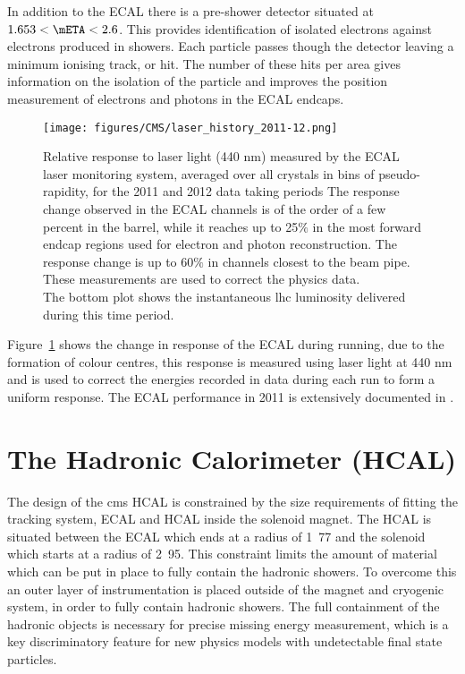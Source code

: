 In addition to the ECAL there is a pre-shower detector situated at $1.653 <
\mETA < 2.6$. This provides identification of isolated electrons against
electrons produced in showers. Each particle passes though the detector leaving
a minimum ionising track, or hit. The number of these hits per area gives
information on the isolation of the particle and improves the position
measurement of electrons and photons in the ECAL endcaps.
\begin{figure}[ht]
  \centering
    \texttt{[image: figures/CMS/laser\_history\_2011-12.png]}
  \caption{Relative response to laser light (440 nm) measured by the ECAL laser
monitoring system, averaged over all crystals in bins of pseudo-rapidity, for
the 2011 and 2012 data taking periods
The response change observed in the ECAL channels is of the order of a few
percent in the barrel, while it reaches up to 25$\%$ in the most forward endcap
regions used for electron and photon reconstruction. The response change is up
to 60$\%$ in channels closest to the beam pipe. These measurements are used to
correct the physics data. \\ The bottom plot shows the instantaneous \ac{lhc}
luminosity delivered during this time period.\cite{CMS-DP-2012-015}}
  \label{fig:figures_CMS_laser_history_2011-12}
\end{figure}

Figure~\ref{fig:figures_CMS_laser_history_2011-12} shows the change in response
of the ECAL during running, due to the formation of colour centres, this
response is measured using laser light at 440 nm and is used to correct the
energies recorded in data during each run to form a uniform response.
The ECAL performance in 2011 is extensively documented in \cite{CMS-DP-2012-002}.

\section{The Hadronic Calorimeter (HCAL)} %
\label{sec:the_hadronic_calorimeter}
The design of the \ac{cms} HCAL is constrained by the size requirements of
fitting the tracking system, ECAL and HCAL inside the solenoid magnet. The HCAL
is situated between the ECAL which ends at a radius of \unit{1.77}{\meter} and
the solenoid which starts at a radius of \unit{2.95}{\meter}. This constraint
limits the amount of material which can be put in place to fully contain the
hadronic showers. To overcome this an outer layer of instrumentation is placed
outside of the magnet and cryogenic system, in order to fully contain hadronic 
showers. The full containment of the hadronic objects is necessary for precise 
missing energy measurement, which is a key discriminatory feature for new 
physics models with undetectable final state particles.

